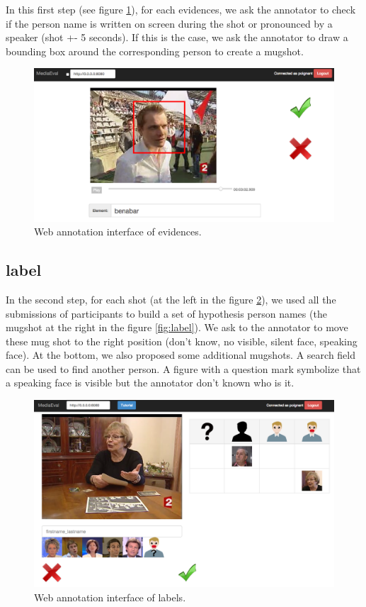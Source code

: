 \documentclass{acm_proc_article-me}
\begin{document}
In this first step (see figure \ref{fig:ann_evidence}), for each evidences, we ask the annotator to check if the person name is written on screen during the shot or pronounced by a speaker (shot +- 5 seconds). If this is the case, we ask the annotator to draw a bounding box around the corresponding person to create a mugshot.

\begin{figure}[htb]
 \center 
 \includegraphics[width=0.8\linewidth]{figs/evidence_interface.png}
 \centering
 \caption {Web annotation interface of evidences.}
 \label{fig:ann_evidence}
\end{figure}

\subsection{label}

In the second step, for each shot (at the left in the figure \ref{fig:ann_label}), we used all the submissions of participants to build a set of hypothesis person names (the mugshot at the right in the figure \ref{fig:label}). We ask to the annotator to move these mug shot to the right position (don't know, no visible, silent face, speaking face). At the bottom, we also proposed some additional mugshots. A search field can be used to find another person. A figure with a question mark symbolize that a speaking face is visible but the annotator don't known who is it.

\begin{figure}[htb]
 \center 
 \includegraphics[width=0.8\linewidth]{figs/label_interface.png}
 \centering
 \caption {Web annotation interface of labels.}
 \label{fig:ann_label}
\end{figure}
\end{document}
